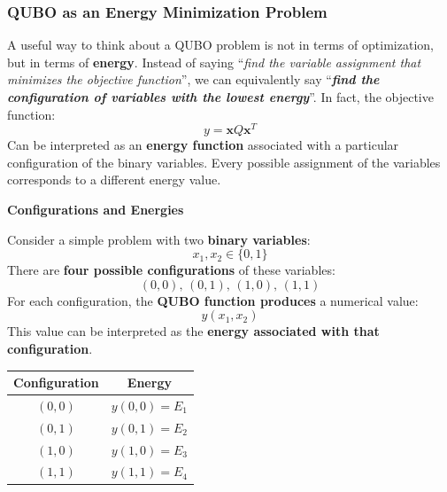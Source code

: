 \subsubsection{QUBO as an Energy Minimization Problem}\label{sec:qubo-as-an-energy-minimization-problem}\label{def:ground-state}

A useful way to think about a QUBO problem is not in terms of optimization, but in terms of \textbf{energy}. Instead of saying ``\emph{find the variable assignment that minimizes the objective function}'', we can equivalently say ``\textbf{\emph{find the configuration of variables with the lowest energy}}''. In fact, the objective function:
\begin{equation*}
    y = \mathbf{x}Q\mathbf{x}^T
\end{equation*}
Can be interpreted as an \textbf{energy function} associated with a particular configuration of the binary variables. Every possible assignment of the variables corresponds to a different energy value.

\highspace
\begin{flushleft}
    \textcolor{Green3}{ \textbf{Configurations and Energies}}
\end{flushleft}
Consider a simple problem with two \textbf{binary variables}:
\begin{equation*}
    x_{1}, x_{2} \in \{0, 1\}
\end{equation*}
There are \textbf{four possible configurations} of these variables:
\begin{equation*}
    \left(0,0\right), \, \left(0,1\right), \, \left(1,0\right), \, \left(1,1\right)
\end{equation*}
For each configuration, the \textbf{QUBO function produces} a numerical value:
\begin{equation*}
    y(x_{1}, x_{2})
\end{equation*}
This value can be interpreted as the \textbf{energy associated with that configuration}.

\begin{table}[!htp]
    \centering
    \begin{tabular}{@{} c c @{}}
        \toprule
        \textbf{Configuration} & \textbf{Energy} \\
        \midrule
        $(0, 0)$ & $y(0, 0) = E_{1}$ \\
        $(0, 1)$ & $y(0, 1) = E_{2}$ \\
        $(1, 0)$ & $y(1, 0) = E_{3}$ \\
        $(1, 1)$ & $y(1, 1) = E_{4}$ \\
        \bottomrule
    \end{tabular}
\end{table}

